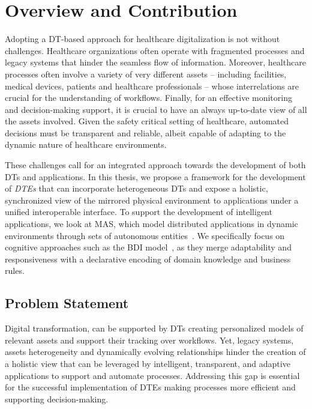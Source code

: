 \section*{Overview and Contribution}

Adopting a \ac{DT}-based approach for healthcare digitalization is not without challenges.
%
Healthcare organizations often operate with fragmented processes and legacy systems that hinder the seamless flow of information.
%
Moreover, healthcare processes often involve a variety of very different assets
-- including facilities, medical devices, patients and healthcare professionals --
whose interrelations are crucial for the understanding of workflows.
%
Finally, for an effective monitoring and decision-making support, it is crucial to have an always up-to-date view of all the assets involved.
%
Given the safety critical setting of healthcare, automated decisions must be transparent and reliable, albeit capable of adapting to the dynamic nature of healthcare environments.


These challenges call for an integrated approach towards the development of both \acp{DT} and applications.
%
In this thesis, we propose a framework for the development of \emph{\acp{DTE}} that can incorporate heterogeneous \acp{DT} and expose a holistic, synchronized view of the mirrored physical environment to applications under a unified interoperable interface.
%
To support the development of intelligent applications, we look at \ac{MAS}, which model distributed applications in dynamic environments through sets of autonomous entities~\missingref{}.
We specifically focus on cognitive approaches such as the \ac{BDI} model~\missingref{}, as they merge adaptability and responsiveness with a declarative encoding of domain knowledge and business rules.

\subsection*{Problem Statement}
Digital transformation, can be supported by \aclp{DT} creating personalized models of relevant assets and support their tracking over workflows.
Yet, legacy systems, assets heterogeneity and dynamically evolving relationships hinder the creation of a holistic view that can be leveraged by intelligent, transparent, and adaptive applications to support and automate processes.
Addressing this gap is essential for the successful implementation of \aclp{DTE} making processes more efficient and supporting decision-making.

